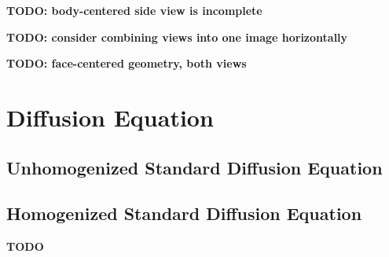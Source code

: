 \documentclass{article}
\begin{document}
\textbf{TODO: body-centered side view is incomplete}

\textbf{TODO: consider combining views into one image horizontally}

\textbf{TODO: face-centered geometry, both views}

\section{Diffusion Equation}

\subsection{Unhomogenized Standard Diffusion Equation}

\subsection{Homogenized Standard Diffusion Equation}



\textbf{TODO}
\end{document}
